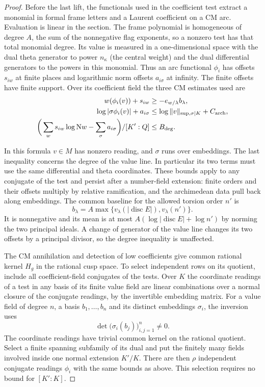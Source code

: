 \begin{proof}
Before the last lift, the functionals used in the coefficient
test extract a monomial in formal frame letters and a Laurent
coefficient on a CM arc. Evaluation is linear in the section.
The frame polynomial is homogeneous of degree \(A\), the sum of the nonnegative flag exponents, so a nonzero test has that total monomial degree. Its value is
measured in a one-dimensional space with the dual theta
generator to power \(n_\kappa\) (the central weight) and the dual differential
generators to the powers in this monomial. Thus an arc
functional \(\phi_i\) has offsets \(s_{iw}\) at finite places
and logarithmic norm offsets \(a_{i\sigma}\) at infinity.
The finite offsets have finite support. Over its coefficient
field the three CM estimates used are
\begin{align*}
 w(\phi_i(v))+s_{iw}&\ge-e_{w/\lambda} b_\lambda,\\
 \log|\sigma\phi_i(v)|+a_{i\sigma}
    &\le \log\|v\|_{\sup,\sigma|K}+C_{\rm arch},\\
 \bigg(\sum_w s_{iw}\log {\rm N}w
       -\sum_{\sigma} a_{i\sigma}\bigg)/[K':\mathbb Q]
    &\le B_{\rm deg}.
\end{align*}

In this formula \(v\in M\) has nonzero reading, and \(\sigma\)
runs over embeddings. The last inequality concerns the
degree of the value line. In particular its two terms must
use the same differential and theta coordinates. These
bounds apply to any conjugate of the test and persist
after a number-field extension: finite orders and their offsets
multiply by relative ramification, and the archimedean
data pull back along embeddings. The common baseline for
the allowed torsion order \(n'\) is
\[
 b_\lambda=A\max\{v_\lambda(|\operatorname{disc}E|),
                               v_\lambda(n')\}.
\]
It is nonnegative and its mean is at most
\(A(\log|\operatorname{disc}E|+\log n')\) by norming the
two principal ideals. A change of generator of the value
line changes its two offsets by a principal divisor, so
the degree inequality is unaffected.

The CM annihilation and detection of low coefficients give
common rational kernel \(H_g\) in the rational cusp space. To select independent rows on its quotient, include
all coefficient-field conjugates of the tests. Over \(K\)
the coordinate readings of a test in any basis of its finite
value field are linear combinations over a normal closure
of the conjugate readings, by the invertible embedding
matrix.
For a value field of degree \(n\), a basis \(b_1,\ldots,b_n\) and its distinct embeddings \(\sigma_i\), the inversion uses
\[
  \det\bigl(\sigma_i(b_j)\bigr)_{i,j=1}^n\ne0 .
\]
 The coordinate readings have trivial common kernel
on the rational quotient. Select a finite spanning subfamily
of its dual and put the finitely many fields involved inside
one normal extension \(K'/K\). There are then \(\rho\)
independent conjugate readings \(\phi_i\) with the same
bounds as above. This selection requires no bound for
\([K':K]\).


\end{proof}
